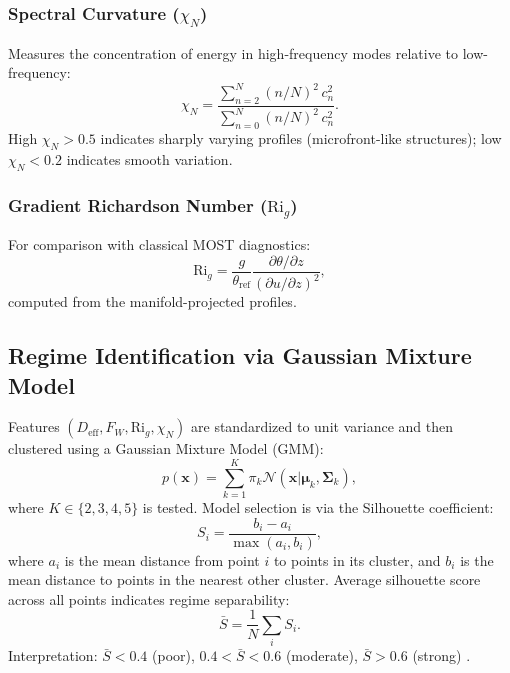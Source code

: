 \documentclass[11pt,a4paper]{article}
\begin{document}
\subsubsection{Spectral Curvature ($\chi_N$)}

Measures the concentration of energy in high-frequency modes relative to low-frequency:
\begin{equation}
\chi_N = \frac{\sum_{n=2}^{N} (n/N)^2 \, c_n^2}{\sum_{n=0}^{N} (n/N)^2 \, c_n^2}.
\label{eq:chi_n}
\end{equation}
High $\chi_N > 0.5$ indicates sharply varying profiles (microfront-like structures); low $\chi_N < 0.2$ indicates smooth variation.

\subsubsection{Gradient Richardson Number ($\mathrm{Ri}_g$)}

For comparison with classical MOST diagnostics:
\begin{equation}
\mathrm{Ri}_g = \frac{g}{\theta_{\mathrm{ref}}} \frac{\partial \theta / \partial z}{(\partial u / \partial z)^2},
\label{eq:rif}
\end{equation}
computed from the manifold-projected profiles.

\subsection{Regime Identification via Gaussian Mixture Model}
\label{sec:methods:clustering}

Features $(D_{\mathrm{eff}}, F_W, \mathrm{Ri}_g, \chi_N)$ are standardized to unit variance and then clustered using a Gaussian Mixture Model (GMM):
\begin{equation}
p(\mathbf{x}) = \sum_{k=1}^{K} \pi_k \mathcal{N}(\mathbf{x} | \boldsymbol{\mu}_k, \boldsymbol{\Sigma}_k),
\end{equation}
where $K \in \{2, 3, 4, 5\}$ is tested. Model selection is via the Silhouette coefficient:
\begin{equation}
S_i = \frac{b_i - a_i}{\max(a_i, b_i)},
\end{equation}
where $a_i$ is the mean distance from point $i$ to points in its cluster, and $b_i$ is the mean distance to points in the nearest other cluster. Average silhouette score across all points indicates regime separability:
\begin{equation}
\bar{S} = \frac{1}{N} \sum_i S_i.
\end{equation}
Interpretation: $\bar{S} < 0.4$ (poor), $0.4 < \bar{S} < 0.6$ (moderate), $\bar{S} > 0.6$ (strong) \citep{Rousseeuw1987}.
\end{document}
